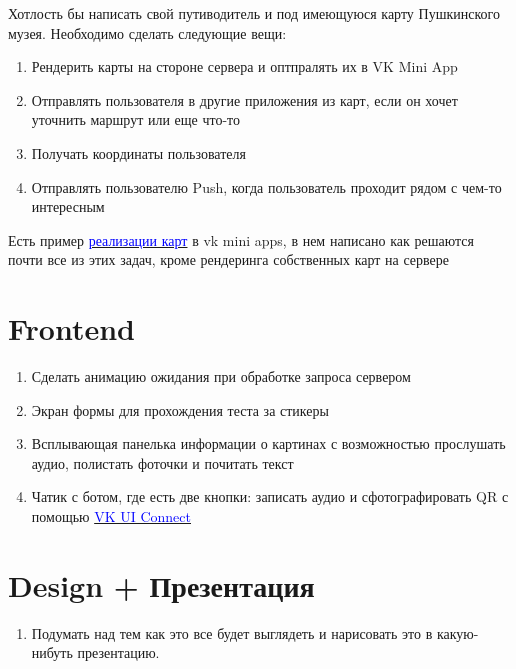 \documentclass[11pt]{article}
\begin{document}
Хотлость бы написать свой путиводитель и под имеющуюся карту Пушкинского музея. Необходимо сделать следующие вещи:
\begin{enumerate}

\item Рендерить карты на стороне сервера и оптпралять их в VK Mini App

\item Отправлять пользователя в другие приложения из карт, если он хочет уточнить маршрут или еще что-то

\item Получать координаты пользователя

\item Отправлять пользователю Push, когда пользователь проходит рядом с чем-то интересным

\end{enumerate}

Есть пример \href{https://vk.com/@clefer-vkapps-api}{\textcolor{blue}{реализации карт}} в vk mini apps, в нем написано как решаются почти все из этих задач, кроме рендеринга собственных карт на сервере

\section{Frontend}
\begin{enumerate}
\item Сделать анимацию ожидания при обработке запроса сервером 

\item  Экран формы для прохождения теста за стикеры

\item Всплывающая панелька информации о картинах с возможностью прослушать аудио, полистать фоточки и почитать текст

\item Чатик с ботом, где есть две кнопки:  записать аудио и сфотографировать QR с помощью  \href{https://vk.com/dev/vk_apps_docs}{\textcolor{blue}{VK UI Connect}}
\end{enumerate}
\section{Design + Презентация}
\begin{enumerate}

\item  Подумать над тем как это все будет выглядеть и нарисовать это в какую-нибуть презентацию.


\end{enumerate}
\end{document}
